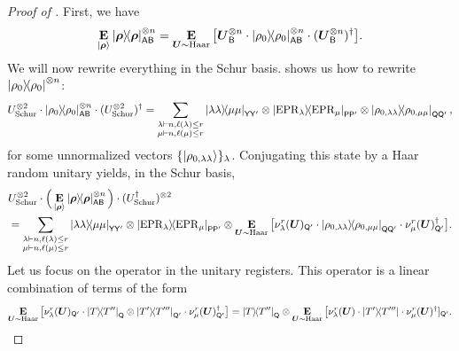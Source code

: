 \begin{proof}[Proof of ]
    First, we have 
    \begin{equation*}
        \mathop{\bf E\/}_{\ket{\boldsymbol{\rho}}} \ketbra{\boldsymbol{\rho}}^{\otimes n}_{\mathsf{AB}} = \mathop{\bf E\/}_{\boldsymbol{U} \sim \mathrm{Haar}} \big[ \boldsymbol{U}_{\mathsf{B}}^{\otimes n} \cdot \ketbra{\rho_0}^{\otimes n}_{\mathsf{AB}} \cdot (\boldsymbol{U}_{\mathsf{B}}^{\otimes n})^\dagger \big].
    \end{equation*}
    We will now rewrite everything in the Schur basis.  shows us how to rewrite $\ketbra{\rho_0}^{\otimes n}$:
    \begin{equation*}
        U_{\mathrm{Schur}}^{\otimes 2} \cdot \ketbra{\rho_0}^{\otimes n}_{\mathsf{AB}} \cdot (U_{\mathrm{Schur}}^{\otimes 2})^\dagger = \sum_{\substack{\lambda \vdash n, \ell(\lambda) \leq r \\ \mu \vdash n, \ell(\mu) \leq r}} \ketbra{\lambda \lambda}{\mu \mu}_{\mathsf{YY'}} \otimes \ketbra{\mathrm{EPR}_{\lambda}}{\mathrm{EPR}_{\mu}}_{\mathsf{PP'}} \otimes \ketbra{\rho_{0, \lambda \lambda}}{\rho_{0, \mu \mu}}_{\mathsf{QQ'}},\end{equation*}
    for some unnormalized vectors $\{\ket{\rho_{0,\lambda\lambda}} \}_{\lambda}$. 
    Conjugating this state by a Haar random unitary yields, in the Schur basis, 
    \begin{align}
     & U_{\mathrm{Schur}}^{\otimes 2} \cdot\Big(\mathop{\bf E\/}_{\ket{\boldsymbol{\rho}}} \ketbra{\boldsymbol{\rho}}_{\mathsf{AB}}^{\otimes n}\Big) \cdot (U_{\mathrm{Schur}}^\dagger)^{\otimes 2} \nonumber \\
     & = \sum_{\substack{\lambda \vdash n, \ell(\lambda) \leq r \\ \mu \vdash n, \ell(\mu) \leq r}} \ketbra{\lambda \lambda}{\mu \mu}_{\mathsf{YY'}} \otimes \ketbra{\mathrm{EPR}_{\lambda}}{\mathrm{EPR}_{\mu}}_{\mathsf{PP'}} \otimes \mathop{\bf E\/}_{\boldsymbol{U} \sim \mathrm{Haar}} \big[ \nu_{\lambda}^r(\boldsymbol{U})_{\mathsf{Q'}} \cdot \ketbra{\rho_{0, \lambda \lambda}}{\rho_{0, \mu \mu}}_{\mathsf{QQ'}} \cdot \nu_{\mu}^r(\boldsymbol{U})^\dagger_{\mathsf{Q'}}\big]. \label{eq:random_purification_formula_eq_1}
    \end{align}
    Let us focus on the operator in the unitary registers. This operator is a linear combination of terms of the form 
    \begin{equation*} 
        \E_{\bU \sim \mathrm{Haar}} \big[ \nu_{\lambda}^r(\bU)_{\reg{Q'}} \cdot \ketbra{T}{T''}_{\reg{Q}} \otimes \ketbra{T'}{T'''}_{\reg{Q'}} \cdot \nu_{\mu}^r(\bU)^\dagger_{\reg{Q'}}\big] = \ketbra{T}{T''}_{\reg{Q}} \otimes \E_{\bU \sim \mathrm{Haar}} \big[ \nu^r_\lambda(\bU) \cdot \ketbra{T'}{T'''} \cdot \nu^r_\mu(\bU)^\dagger]_{\reg{Q'}}.

\end{equation*}
\end{proof}
